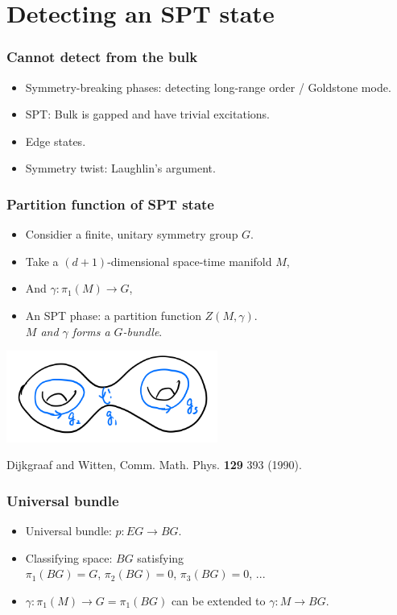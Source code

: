\documentclass[xcolor=table, aspectratio=43,ignorenonframetext]{beamer}
\begin{document}
\section{Detecting an SPT state}

\begin{frame}
	\frametitle{Cannot detect from the bulk}
	\begin{itemize}
		\item Symmetry-breaking phases: detecting long-range order / Goldstone mode.
		\item SPT: Bulk is gapped and have trivial excitations.
		\item Edge states.
		\item Symmetry twist: Laughlin's argument.
	\end{itemize}
	\begin{center}
	\end{center}
\end{frame}

\begin{frame}
	\frametitle{Partition function of SPT state}
	\begin{itemize}
		\item Considier a finite, unitary symmetry group $G$.
		\item Take a $(d+1)$-dimensional space-time manifold $M$,
		\item And $\gamma:\pi_1(M)\rightarrow G$,
		\item An SPT phase: a partition function $Z(M,\gamma)$.\\
		\emph{$M$ and $\gamma$ forms a $G$-bundle}.
	\end{itemize}
	\begin{center}
		\includegraphics[height=3cm]{manifold}
	\end{center}
	{\small Dijkgraaf and Witten, Comm. Math. Phys. \textbf{129} 393 (1990).}
\end{frame}

\begin{frame}
	\frametitle{Universal bundle}
	\begin{itemize}
		\item Universal bundle: $p: EG \rightarrow BG$.
		\item Classifying space: $BG$ satisfying\\
		$\pi_1(BG) = G$, $\pi_2(BG)=0$, $\pi_3(BG)=0$, ...
		\item $\gamma:\pi_1(M)\rightarrow G=\pi_1(BG)$ can be extended to $\gamma:M\rightarrow BG$.
	\end{itemize}
\end{frame}
\end{document}
